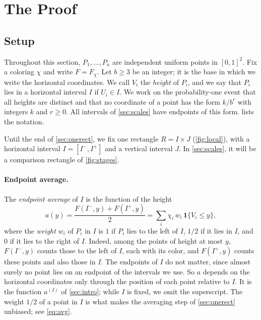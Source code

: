\documentclass[11pt,letterpaper]{article}
\newcommand{\1}{\mathbf{1}}
\begin{document}
\section{The Proof}\label{sec:proof}

\subsection{Setup}\label{sec:setup}

Throughout this section, $P_1,\dots,P_n$ are independent uniform points in $[0,1]^2$. Fix a coloring $\chi$ and write $F=F_\chi$. Let $b\ge3$ be an integer; it is the base in which we write the horizontal coordinates. We call $V_i$ the \emph{height} of $P_i$, and we say that $P_i$ lies in a horizontal interval $I$ if $U_i\in I$. We work on the probability-one event that all heights are distinct and that no coordinate of a point has the form $k/b^r$ with integers $k$ and $r\ge0$. All intervals of \cref{sec:scales} have endpoints of this form.  lists the notation.

Until the end of \cref{sec:onerect}, we fix one rectangle $R=I\times J$ (\cref{fig:local}), with a horizontal interval $I=[I^-,I^+]$ and a vertical interval $J$. In \cref{sec:scales}, it will be a comparison rectangle of \cref{fig:stages}.


\paragraph{Endpoint average.}
The \emph{endpoint average} of $I$ is the function of the height
\begin{equation}\label{eq:a}
a(y)=\frac{F(I^-,y)+F(I^+,y)}2=\sum_i\chi_i\,w_i\,\1\{V_i\le y\},
\end{equation}
where the \emph{weight} $w_i$ of $P_i$ in $I$ is $1$ if $P_i$ lies to the left of $I$, $1/2$ if it lies in $I$, and $0$ if it lies to the right of $I$. Indeed, among the points of height at most $y$, $F(I^-,y)$ counts those to the left of $I$, each with its color, and $F(I^+,y)$ counts these points and also those in $I$. The endpoints of $I$ do not matter, since almost surely no point lies on an endpoint of the intervals we use. So $a$ depends on the horizontal coordinates only through the position of each point relative to $I$. It is the function $a^{(I)}$ of \cref{sec:intro}; while $I$ is fixed, we omit the superscript. The weight $1/2$ of a point in $I$ is what makes the averaging step of \cref{sec:onerect} unbiased; see \eqref{eq:avg}.
\end{document}
